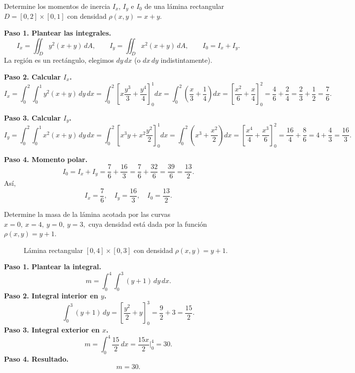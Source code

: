 \begin{example}
Determine los momentos de inercia \(I_x\), \(I_y\) e \(I_0\) de una lámina rectangular \(D=[0,2]\times[0,1]\) con densidad \(\rho(x,y)=x+y\).
\begin{myproof}
\textbf{Paso 1. Plantear las integrales.}
\[
I_x = \iint_D y^2(x+y)\,dA,\qquad
I_y = \iint_D x^2(x+y)\,dA,\qquad
I_0=I_x+I_y.
\]
La región es un rectángulo, elegimos \(dy\,dx\) (o \(dx\,dy\) indistintamente).

\textbf{Paso 2. Calcular $I_x$.}
\[
I_x = \int_0^2\int_0^1 y^2(x+y)\,dy\,dx
= \int_0^2\left[ x\frac{y^3}{3} + \frac{y^4}{4} \right]_0^1 dx
= \int_0^2\left(\frac{x}{3}+\frac{1}{4}\right)dx
= \left[\frac{x^2}{6}+\frac{x}{4}\right]_0^2
= \frac{4}{6}+\frac{2}{4} = \frac{2}{3}+\frac{1}{2} = \frac{7}{6}.
\]

\textbf{Paso 3. Calcular $I_y$.}
\[
I_y = \int_0^2\int_0^1 x^2(x+y)\,dy\,dx
= \int_0^2\left[ x^3 y + x^2\frac{y^2}{2} \right]_0^1 dx
= \int_0^2\left(x^3+\frac{x^2}{2}\right)dx
= \left[\frac{x^4}{4}+\frac{x^3}{6}\right]_0^2
= \frac{16}{4}+\frac{8}{6} = 4+\frac{4}{3} = \frac{16}{3}.
\]

\textbf{Paso 4. Momento polar.}
\[
I_0 = I_x+I_y = \frac{7}{6}+\frac{16}{3} = \frac{7}{6}+\frac{32}{6} = \frac{39}{6} = \frac{13}{2}.
\]
Así,
\[
\boxed{I_x=\frac{7}{6}},\quad \boxed{I_y=\frac{16}{3}},\quad \boxed{I_0=\frac{13}{2}}.
\]
\end{myproof}
\end{example}

\begin{prob}
Determine la masa de la lámina acotada por las curvas $x=0,\ x=4,\ y=0,\ y=3,$ cuya densidad está dada por la función $\rho(x,y)=y+1.$
\begin{myproof} 
\begin{figure}[H]
\centering
{}
\caption{Lámina rectangular $[0,4]\times[0,3]$ con densidad $\rho(x,y)=y+1$.}
\label{fig:lamina_rect_masa}
\end{figure}
\textbf{Paso 1. Plantear la integral.}
\[
m=\int_{0}^{4}\int_{0}^{3}(y+1)\,dy\,dx.
\]
\textbf{Paso 2. Integral interior en $y$.}
\[
\int_{0}^{3}(y+1)\,dy=\left[\frac{y^2}{2}+y\right]_{0}^{3}=\frac{9}{2}+3=\frac{15}{2}.
\]
\textbf{Paso 3. Integral exterior en $x$.}
\[
m=\int_{0}^{4}\frac{15}{2}\,dx=\frac{15x}{2}\Big|_{0}^{4}=30.
\]
\textbf{Paso 4. Resultado.}
\[
\boxed{m=30.}
\]
\end{myproof}
\end{prob}

